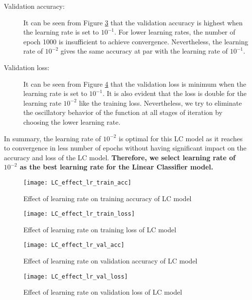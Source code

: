\documentclass[12pt, a4paper, twoside]{article}
\begin{document}
\begin{description}
	\item[Validation accuracy:] It can be seen from Figure \ref{F:LC_effect_lr_val_acc} that the validation accuracy is highest when the learning rate is set to $10^{-1}$.  For lower learning rates, the number of epoch 1000 is insufficient to achieve convergence. Nevertheless, the learning rate of $10^{-2}$ gives the same accuracy at par with the learning rate of $10^{-1}$.
	\item[Validation loss:] It can be seen from Figure \ref{F:LC_effect_lr_val_loss} that the validation loss is minimum when the learning rate is set to $10^{-1}$. It is also evident that the loss is double for the learning rate $10^{-2}$ like the training loss. Nevertheless, we try to eliminate the oscillatory behavior of the function at all stages of iteration by choosing the lower learning rate. 
\end{description}
\par
In summary, the learning rate of $10^{-2}$ is optimal for this LC model as it reaches to convergence in less number of epochs without having significant impact on the accuracy and loss of the LC model. \textbf{Therefore, we select learning rate of $10^{-2}$ as the best learning rate for the Linear Classifier model.}

\begin{figure}[h!]
	\centering
	\texttt{[image: LC\_effect\_lr\_train\_acc]}
	\caption{Effect of learning rate on training accuracy of LC model}
	\label{F:LC_effect_lr_train_acc}
\end{figure}
\begin{figure}[h!]
	\centering
	\texttt{[image: LC\_effect\_lr\_train\_loss]}
	\caption{Effect of learning rate on training loss of LC model}
	\label{F:LC_effect_lr_train_loss}
\end{figure}
\begin{figure}[h!]
	\centering
	\texttt{[image: LC\_effect\_lr\_val\_acc]}
	\caption{Effect of learning rate on validation accuracy of LC model}
	\label{F:LC_effect_lr_val_acc}
\end{figure}
\begin{figure}[h!]
	\centering
	\texttt{[image: LC\_effect\_lr\_val\_loss]}
	\caption{Effect of learning rate on validation loss of LC model}
	\label{F:LC_effect_lr_val_loss}
\end{figure}
\end{document}
